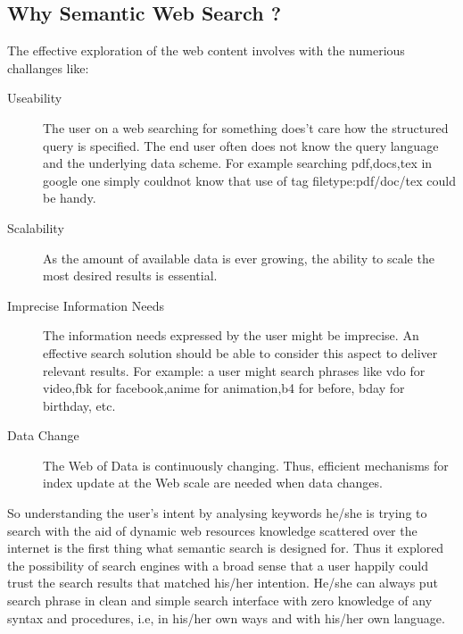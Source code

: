 \documentclass[12pt,a4]{article}
\begin{document}
\subsection{Why Semantic Web Search ?}
The effective exploration of the web content involves with the numerious challanges like:
\begin{description}
\item[Useability] The user on a web searching for something does't care how the structured query is specified. The end user often does not know the query language and the underlying data scheme. For example searching pdf,docs,tex in google one simply couldnot know that use of tag filetype:pdf/doc/tex could be handy.
\item[Scalability] As the amount of available data is ever growing, the ability to scale the most desired results is essential.
\item[Imprecise Information Needs] The information needs expressed by the user might be imprecise. An effective search solution should be able to consider this aspect to deliver relevant results. For example: a user might search phrases like vdo for video,fbk for facebook,anime for animation,b4 for before, bday for birthday, etc. 
\item[Data Change] The Web of Data is continuously changing. Thus, efficient mechanisms for index update at the Web scale are needed when data changes. 
\end{description}
So understanding the user's intent by analysing keywords he/she is trying to search with the aid of dynamic web resources knowledge scattered over the internet is the first thing what semantic search is designed for. Thus it explored the possibility of search engines with a broad sense that a user happily could trust the search results that matched his/her intention. He/she can always put search phrase in clean and simple search interface with zero knowledge of any syntax and procedures, i.e, in his/her own ways and with his/her own language.
\end{document}
